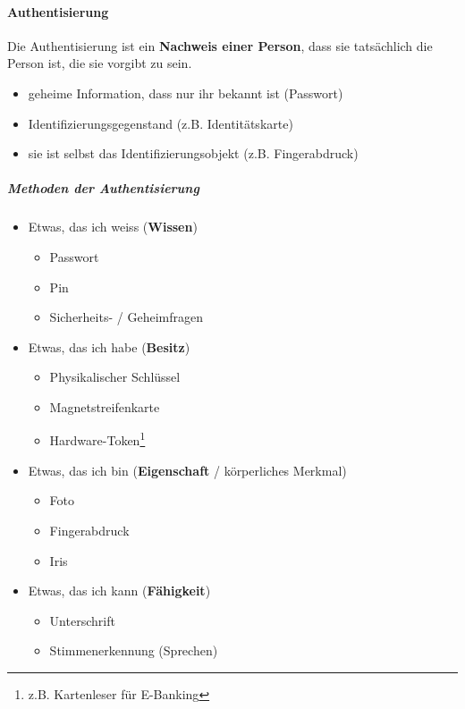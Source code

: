 \paragraph*{Authentisierung}\label{par:Authentication}\label{para:Authentisierung}Die Authentisierung ist ein \textbf{Nachweis einer Person}, dass sie tatsächlich die Person ist, die sie vorgibt zu sein.
\begin{itemize}
    \item geheime Information, dass nur ihr bekannt ist (Passwort)
    \item Identifizierungsgegenstand (z.B. Identitätskarte)
    \item sie ist selbst das Identifizierungsobjekt (z.B. Fingerabdruck)
\end{itemize}

\subparagraph*{Methoden der Authentisierung}
\begin{itemize}
    \item Etwas, das ich weiss (\textbf{Wissen})
    \begin{itemize}
        \item Passwort
        \item Pin
        \item Sicherheits- / Geheimfragen
    \end{itemize}
    \item Etwas, das ich habe (\textbf{Besitz})
    \begin{itemize}
        \item Physikalischer Schlüssel
        \item Magnetstreifenkarte
        \item Hardware-Token\footnote{z.B. Kartenleser für E-Banking}
    \end{itemize}
    \item Etwas, das ich bin (\textbf{Eigenschaft} / körperliches Merkmal)
    \begin{itemize}
        \item Foto
        \item Fingerabdruck
        \item Iris
    \end{itemize}
    \item Etwas, das ich kann (\textbf{Fähigkeit})
    \begin{itemize}
        \item Unterschrift
        \item Stimmenerkennung (Sprechen)
    \end{itemize}
\end{itemize}


